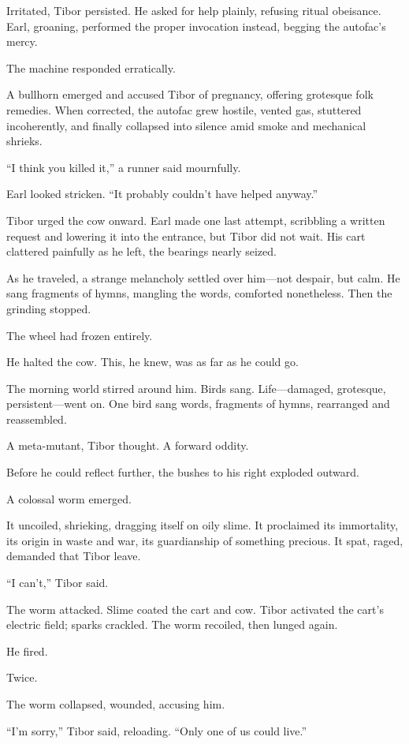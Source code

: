 Irritated, Tibor persisted. He asked for help plainly, refusing ritual obeisance. Earl, groaning, performed the proper invocation instead, begging the autofac’s mercy.

The machine responded erratically.

A bullhorn emerged and accused Tibor of pregnancy, offering grotesque folk remedies. When corrected, the autofac grew hostile, vented gas, stuttered incoherently, and finally collapsed into silence amid smoke and mechanical shrieks.

“I think you killed it,” a runner said mournfully.

Earl looked stricken. “It probably couldn’t have helped anyway.”

Tibor urged the cow onward. Earl made one last attempt, scribbling a written request and lowering it into the entrance, but Tibor did not wait. His cart clattered painfully as he left, the bearings nearly seized.

As he traveled, a strange melancholy settled over him—not despair, but calm. He sang fragments of hymns, mangling the words, comforted nonetheless. Then the grinding stopped.

The wheel had frozen entirely.

He halted the cow. This, he knew, was as far as he could go.

The morning world stirred around him. Birds sang. Life—damaged, grotesque, persistent—went on. One bird sang words, fragments of hymns, rearranged and reassembled.

A meta-mutant, Tibor thought. A forward oddity.

Before he could reflect further, the bushes to his right exploded outward.

A colossal worm emerged.

It uncoiled, shrieking, dragging itself on oily slime. It proclaimed its immortality, its origin in waste and war, its guardianship of something precious. It spat, raged, demanded that Tibor leave.

“I can’t,” Tibor said.

The worm attacked. Slime coated the cart and cow. Tibor activated the cart’s electric field; sparks crackled. The worm recoiled, then lunged again.

He fired.

Twice.

The worm collapsed, wounded, accusing him.

“I’m sorry,” Tibor said, reloading. “Only one of us could live.”

